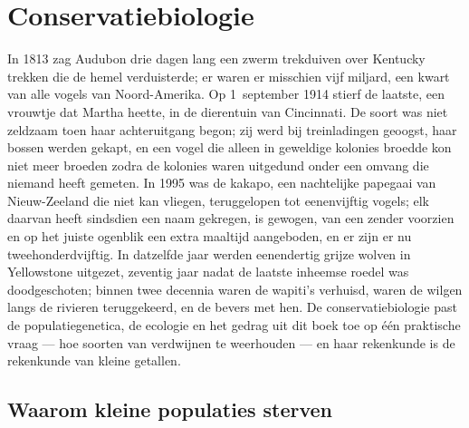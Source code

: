 \chapter{Conservatiebiologie}\label{ch:b3:conservation-biology}

In 1813 zag Audubon drie dagen lang een zwerm trekduiven over Kentucky
trekken die de hemel verduisterde; er waren er misschien vijf miljard,
een kwart van alle vogels van Noord-Amerika. Op 1~september 1914 stierf
de laatste, een vrouwtje dat Martha heette, in de dierentuin van
Cincinnati. De soort was niet zeldzaam toen haar achteruitgang begon;
zij werd bij treinladingen geoogst, haar bossen werden gekapt, en een
vogel die alleen in geweldige kolonies broedde kon niet meer broeden
zodra de kolonies waren uitgedund onder een omvang die niemand heeft
gemeten. In 1995 was de kakapo, een nachtelijke papegaai van
Nieuw-Zeeland die niet kan vliegen, teruggelopen tot eenenvijftig
vogels; elk daarvan heeft sindsdien een naam gekregen, is gewogen, van
een zender voorzien en op het juiste ogenblik een extra maaltijd
aangeboden, en er zijn er nu tweehonderdvijftig. In datzelfde jaar
werden eenendertig grijze wolven in Yellowstone uitgezet, zeventig jaar
nadat de laatste inheemse roedel was doodgeschoten; binnen twee
decennia waren de wapiti's verhuisd, waren de wilgen langs de rivieren
teruggekeerd, en de bevers met hen. De conservatiebiologie past de
populatiegenetica, de ecologie en het gedrag uit dit boek toe op één
praktische vraag --- hoe soorten van verdwijnen te weerhouden --- en
haar rekenkunde is de rekenkunde van kleine getallen.

\section{Waarom kleine populaties sterven}

